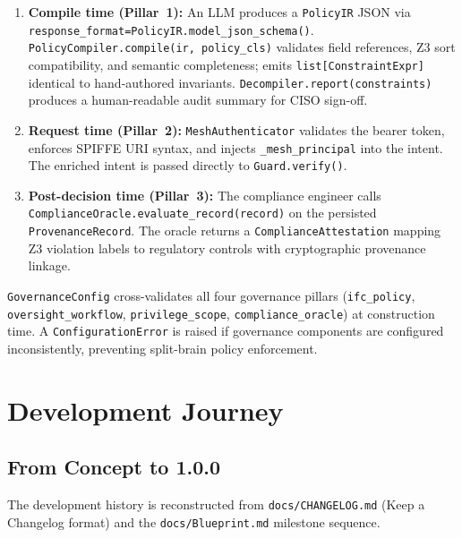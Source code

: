 \documentclass[12pt,a4paper,oneside]{report}
\newcommand{\fname}[1]{\texttt{#1}}          %
\newcommand{\code}[1]{\texttt{#1}}           %
\begin{document}
\begin{enumerate}
  \item \textbf{Compile time (Pillar~1):} An LLM produces a \code{PolicyIR}
        JSON via \code{response\_format=PolicyIR.model\_json\_schema()}.
        \code{PolicyCompiler.compile(ir, policy\_cls)} validates field
        references, Z3 sort compatibility, and semantic completeness; emits
        \code{list[ConstraintExpr]} identical to hand-authored invariants.
        \code{Decompiler.report(constraints)} produces a human-readable
        audit summary for CISO sign-off.

  \item \textbf{Request time (Pillar~2):} \code{MeshAuthenticator} validates
        the bearer token, enforces SPIFFE URI syntax, and injects
        \code{\_mesh\_principal} into the intent.  The enriched intent is
        passed directly to \code{Guard.verify()}.

  \item \textbf{Post-decision time (Pillar~3):} The compliance engineer calls
        \code{ComplianceOracle.evaluate\_record(record)} on the persisted
        \code{ProvenanceRecord}.  The oracle returns a
        \code{ComplianceAttestation} mapping Z3 violation labels to
        regulatory controls with cryptographic provenance linkage.
\end{enumerate}

\code{GovernanceConfig} cross-validates all four governance pillars
(\code{ifc\_policy}, \code{oversight\_workflow}, \code{privilege\_scope},
\code{compliance\_oracle}) at construction time.  A \code{ConfigurationError}
is raised if governance components are configured inconsistently, preventing
split-brain policy enforcement.

\chapter{Development Journey}

\section{From Concept to 1.0.0}

The development history is reconstructed from \fname{docs/CHANGELOG.md} (Keep
a Changelog format) and the \fname{docs/Blueprint.md} milestone sequence.
\end{document}
